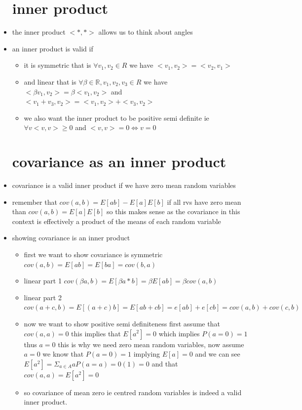 \documentclass{article}
\begin{document}
\begin{itemize}
\section{inner product}
\item the inner product $<*,*>$ allows us to think about angles
\item an inner product is valid if 
\begin{itemize}
    \item it is symmetric that is $\forall v_1,v_2\in R$ we have $<v_1,v_2>=<v_2,v_1>$
    \item and linear that is $\forall \beta \in \mathbb{R}, v_1,v_2,v_3\in R$ we have $<\beta v_1,v_2>=\beta <v_1,v_2>$ and $<v_1+v_3,v_2>=<v_1,v_2>+<v_3,v_2>$ 
    \item we also want the inner product to be positive semi definite ie $\forall v <v,v>\geq0$ and $<v,v>=0 \iff v=0$
\end{itemize}
\section{covariance as an inner product}
\item covariance is a valid inner product if we have zero mean random variables 
\item remember that $cov(a,b)=E[ab]-E[a]E[b]$ if all rvs have zero mean than $cov(a,b)=E[a]E[b]$ so this makes sense as the covariance in this context is effectively a product of the means of each random variable 
\item showing covariance is an inner product
\begin{itemize}
    \item first we want to show covariance is symmetric $cov(a,b)=E[ab]=E[ba]=cov(b,a)$
    \item linear part 1 $cov(\beta a, b)=E[\beta a*b]=\beta E[ab]=\beta cov(a,b)$
    \item linear part 2 $cov(a+c,b)=E[(a+c)b]=E[ab+cb]=e[ab]+e[cb]=cov(a,b)+cov(c,b)$
    \item now we want to show positive semi definiteness first assume that $cov(a,a)=0$ this implies that $E[a^2]=0$ which implies $P(a=0)=1$ thus $a=0$ this is why we need zero mean random variables, now assume $a=0$ we know that $P(a=0)=1$ implying $E[a]=0$ and we can see $E[a^2]=\Sigma_{a\in A}aP(a=a)=0(1)=0$ and that $cov(a,a)=E[a^2]=0$ 
    \item so covariance of mean zero ie centred random variables is indeed a valid inner product. 
\end{itemize}

\end{itemize}
\end{document}
